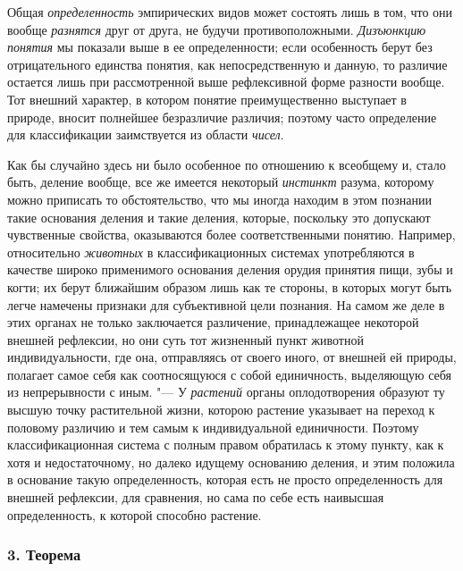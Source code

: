 Общая {\em определенность}
эмпирических видов может состоять лишь в том, что они вообще
{\em разнятся} друг от
друга, не будучи противоположными.
{\em Дизъюнкцию понятия}
мы показали выше в ее определенности; если особенность берут
без отрицательного единства понятия, как непосредственную и данную, то
различие остается лишь при рассмотренной выше рефлексивной форме разности
вообще. Тот внешний характер, в котором понятие преимущественно выступает в
природе, вносит полнейшее безразличие различия; поэтому часто определение
для классификации заимствуется из области
{\em чисел}.

Как бы случайно здесь ни было особенное по отношению к
всеобщему и, стало быть, деление вообще, все же имеется некоторый
{\em инстинкт} разума,
которому можно приписать то обстоятельство, что мы иногда находим в этом
познании такие основания деления и такие деления, которые, поскольку это
допускают чувственные свойства, оказываются более соответственными понятию.
Например, относительно {\em животных}
в классификационных системах употребляются в качестве широко
применимого основания деления орудия принятия пищи, зубы и когти; их берут
ближайшим образом лишь как те стороны, в которых могут быть легче намечены
признаки для субъективной цели познания. На самом же деле в этих органах не
только заключается различение, принадлежащее некоторой внешней рефлексии,
но они суть тот жизненный пункт животной индивидуальности, где она,
отправляясь от своего иного, от внешней ей природы, полагает самое себя
как соотносящуюся с собой единичность, выделяющую себя из непрерывности с
иным. "--- У {\em растений} органы
оплодотворения образуют ту высшую точку растительной жизни, которою
растение указывает на переход к половому различию и тем самым к
индивидуальной единичности. Поэтому классификационная система с полным
правом обратилась к этому пункту, как к хотя и недостаточному, но далеко
идущему основанию деления, и этим положила в основание такую
определенность, которая есть не просто определенность для внешней
рефлексии, для сравнения, но сама по себе есть наивысшая определенность, к
которой способно растение.

\subsubsection[3. Теорема]{\bfseries 3. Теорема}

